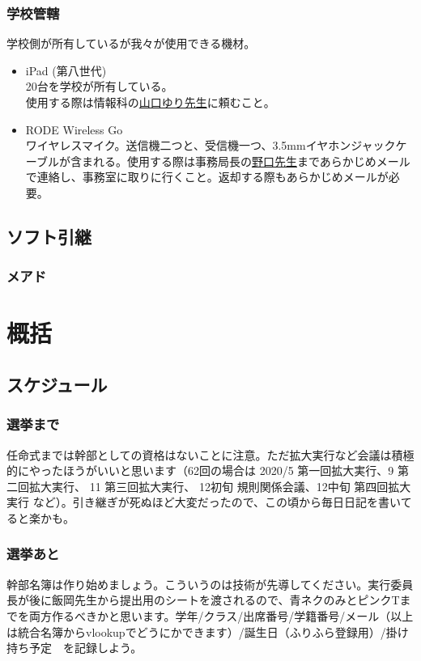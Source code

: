 \documentclass[dvipdfmx,jb5]{jarticle}
\newcommand{\mail}[2]{\href{#2}{#1}}
\begin{document}
 \subsubsection{学校管轄}
 学校側が所有しているが我々が使用できる機材。
 \begin{itemize}
  \item iPad (第八世代)\\
  20台を学校が所有している。\\
  使用する際は情報科の\mail{山口ゆり先生}{yuri.yamaguchi@seiko.ac.jp}に頼むこと。
  \item RODE Wireless Go\\
  ワイヤレスマイク。送信機二つと、受信機一つ、3.5mmイヤホンジャックケーブルが含まれる。使用する際は事務局長の\mail{野口先生}{noguchi@seiko.ac.jp}まであらかじめメールで連絡し、事務室に取りに行くこと。返却する際もあらかじめメールが必要。
 \end{itemize}

 \subsection{ソフト引継}
 \subsubsection{メアド}


\section{概括}
\subsection{スケジュール}
\subsubsection{選挙まで}
任命式までは幹部としての資格はないことに注意。ただ拡大実行など会議は積極的にやったほうがいいと思います（62回の場合は 2020/5 第一回拡大実行、9 第二回拡大実行、 11 第三回拡大実行、 12初旬 規則関係会議、12中旬 第四回拡大実行 など）。引き継ぎが死ぬほど大変だったので、この頃から毎日日記を書いてると楽かも。

\subsubsection{選挙あと}
幹部名簿は作り始めましょう。こういうのは技術が先導してください。実行委員長が後に飯岡先生から提出用のシートを渡されるので、青ネクのみとピンクTまでを両方作るべきかと思います。学年/クラス/出席番号/学籍番号/メール（以上は統合名簿からvlookupでどうにかできます）/誕生日（ふりふら登録用）/掛け持ち予定　を記録しよう。
\end{document}
